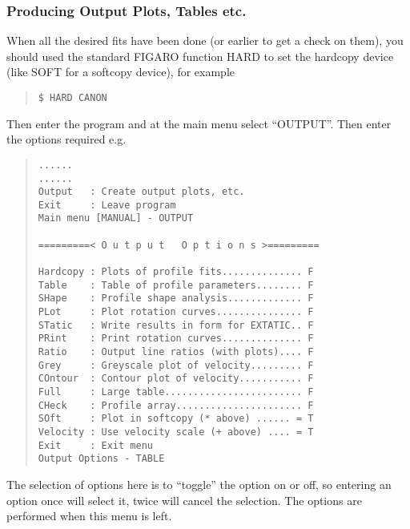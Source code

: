 \subsubsection{Producing Output Plots, Tables etc.}
\label{long.out}

When all the desired fits have been done (or
earlier to get a check on them), you should used the standard FIGARO
function HARD to set the hardcopy device (like SOFT for a softcopy
device), for example
\begin{quote}\begin{verbatim}
$ HARD CANON
\end{verbatim}\end{quote}

Then enter the program and at the main menu select ``OUTPUT''. Then
enter the options required e.g.\
\begin{quote}\begin{verbatim}
......
......
Output   : Create output plots, etc.
Exit     : Leave program
Main menu [MANUAL] - OUTPUT
 
=========< O u t p u t   O p t i o n s >=========
 
Hardcopy : Plots of profile fits.............. F
Table    : Table of profile parameters........ F
SHape    : Profile shape analysis............. F
PLot     : Plot rotation curves............... F
STatic   : Write results in form for EXTATIC.. F
PRint    : Print rotation curves.............. F
Ratio    : Output line ratios (with plots).... F
Grey     : Greyscale plot of velocity......... F
COntour  : Contour plot of velocity........... F
Full     : Large table........................ F
CHeck    : Profile array...................... F
SOft     : Plot in softcopy (* above) ...... = T
Velocity : Use velocity scale (+ above) .... = T
Exit     : Exit menu
Output Options - TABLE
\end{verbatim}\end{quote}
The selection of options here is to ``toggle'' the option on or off,
so entering an option once will select it, twice will cancel the
selection. The options are performed when this menu is left.
